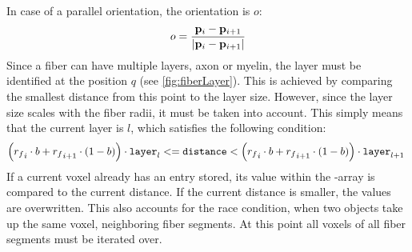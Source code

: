 In case of a parallel orientation, the orientation is $o$:
\begin{align}
\begin{split}
    o = \frac{\mathbf{p}_i - \mathbf{p}_{i+1}}{\lvert\mathbf{p}_i - \mathbf{p}_{i+1}\rvert}
\end{split}
\end{align}
% 
Since a fiber can have multiple layers, \eg{} axon or myelin, the layer must be identified at the  position $q$ (see \cref{fig:fiberLayer}).
This is achieved by comparing the smallest distance from this point to the layer size.
However, since the layer size scales with the fiber radii, it must be taken into account.
This simply means that the current layer is $l$, which satisfies the following condition: 
\begin{align}
    \left(\fiberRadius_i \cdot b + \fiberRadius_{i+1} \cdot(1-b)\right) \cdot \code{layer}_l <= \code{distance} < \left(\fiberRadius_i \cdot b + \fiberRadius_{i+1} \cdot(1-b)\right) \cdot \code{layer}_{l+1} \ 
\end{align}
% 
If a current voxel already has an entry stored, its value within the -array is compared to the current distance.
If the current distance is smaller, the values are overwritten.
This also accounts for the race condition, when two objects take up the same voxel, \eg{} neighboring fiber segments.
At this point all voxels of all fiber segments must be iterated over.
% 
